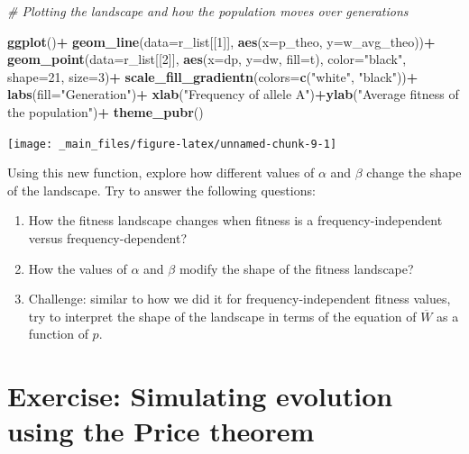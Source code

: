 \documentclass[
]{book}
\newenvironment{Shaded}{\begin{snugshade}}{\end{snugshade}}
\newcommand{\AttributeTok}[1]{\textcolor[rgb]{0.13,0.29,0.53}{#1}}
\newcommand{\CommentTok}[1]{\textcolor[rgb]{0.56,0.35,0.01}{\textit{#1}}}
\newcommand{\DecValTok}[1]{\textcolor[rgb]{0.00,0.00,0.81}{#1}}
\newcommand{\FunctionTok}[1]{\textcolor[rgb]{0.13,0.29,0.53}{\textbf{#1}}}
\newcommand{\NormalTok}[1]{#1}
\newcommand{\SpecialCharTok}[1]{\textcolor[rgb]{0.81,0.36,0.00}{\textbf{#1}}}
\newcommand{\StringTok}[1]{\textcolor[rgb]{0.31,0.60,0.02}{#1}}
\providecommand{\tightlist}{%
  \setlength{\itemsep}{0pt}\setlength{\parskip}{0pt}}
\begin{document}
\begin{Shaded}
\begin{Highlighting}[]
\CommentTok{\# Plotting the landscape and how the population moves over generations}

\FunctionTok{ggplot}\NormalTok{()}\SpecialCharTok{+}
  \FunctionTok{geom\_line}\NormalTok{(}\AttributeTok{data=}\NormalTok{r\_list[[}\DecValTok{1}\NormalTok{]], }\FunctionTok{aes}\NormalTok{(}\AttributeTok{x=}\NormalTok{p\_theo, }\AttributeTok{y=}\NormalTok{w\_avg\_theo))}\SpecialCharTok{+}
  \FunctionTok{geom\_point}\NormalTok{(}\AttributeTok{data=}\NormalTok{r\_list[[}\DecValTok{2}\NormalTok{]], }\FunctionTok{aes}\NormalTok{(}\AttributeTok{x=}\NormalTok{dp, }\AttributeTok{y=}\NormalTok{dw, }\AttributeTok{fill=}\NormalTok{t), }\AttributeTok{color=}\StringTok{"black"}\NormalTok{, }\AttributeTok{shape=}\DecValTok{21}\NormalTok{, }\AttributeTok{size=}\DecValTok{3}\NormalTok{)}\SpecialCharTok{+}
  \FunctionTok{scale\_fill\_gradientn}\NormalTok{(}\AttributeTok{colors=}\FunctionTok{c}\NormalTok{(}\StringTok{"white"}\NormalTok{, }\StringTok{"black"}\NormalTok{))}\SpecialCharTok{+}
  \FunctionTok{labs}\NormalTok{(}\AttributeTok{fill=}\StringTok{"Generation"}\NormalTok{)}\SpecialCharTok{+}
  \FunctionTok{xlab}\NormalTok{(}\StringTok{"Frequency of allele A"}\NormalTok{)}\SpecialCharTok{+}\FunctionTok{ylab}\NormalTok{(}\StringTok{"Average fitness of the population"}\NormalTok{)}\SpecialCharTok{+}
  \FunctionTok{theme\_pubr}\NormalTok{()}
\end{Highlighting}
\end{Shaded}

\texttt{[image: \_main\_files/figure-latex/unnamed-chunk-9-1]}

Using this new function, explore how different values of \(\alpha\) and \(\beta\) change the shape of the landscape. Try to answer the following questions:

\begin{enumerate}
\def\labelenumi{\arabic{enumi}.}
\tightlist
\item
  How the fitness landscape changes when fitness is a frequency-independent versus frequency-dependent?
\item
  How the values of \(\alpha\) and \(\beta\) modify the shape of the fitness landscape?
\item
  Challenge: similar to how we did it for frequency-independent fitness values, try to interpret the shape of the landscape in terms of the equation of \(\overline{W}\) as a function of \(p\).
\end{enumerate}

\hypertarget{exercise-simulating-evolution-using-the-price-theorem}{%
\chapter{Exercise: Simulating evolution using the Price theorem}\label{exercise-simulating-evolution-using-the-price-theorem}}
\end{document}
